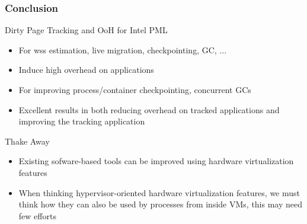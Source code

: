 \documentclass[xcolor=table,bigger,unknownkeysallowed]{beamer}
\begin{document}
        \begin{frame}
		\thispagestyle{empty}
        \frametitle{Conclusion} 
			\begin{block}{Dirty Page Tracking and OoH for Intel PML}
				\begin{itemize}
					\item For wss estimation, live migration, checkpointing, GC, ...
					\item Induce high overhead on applications
				\end{itemize}
				\begin{itemize}
					\item For improving process/container checkpointing, concurrent GCs
					\item Excellent results in both reducing overhead on tracked applications and improving the tracking application
				\end{itemize}
			\end{block}
			\begin{block}{Thake Away}
				\begin{itemize}
					\item Existing sofware-based tools can be improved using hardware virtualization features
					\item When thinking hypervisor-oriented hardware virtualization features, we must think how they can also be used by processes from inside VMs, this may need few efforts
				\end{itemize}
			\end{block}							
        \end{frame}                       
      
\end{document}
